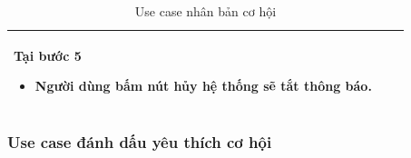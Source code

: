 \documentclass[12pt,a4paper]{article}
\begin{document}
\begin{table}[H]
\begin{tabular}{|p{3.5cm}|p{11.5cm}|c|}
            Tại bước 5\newline
            \vspace{-.8cm}\begin{itemize}
                              \item Người dùng bấm nút hủy hệ thống sẽ tắt thông báo.
            \end{itemize} \\
            \hline
        \end{tabular}
        \caption{Use case nhân bản cơ hội }

    \end{table}


    \subsubsection*{Use case đánh dấu yêu thích cơ hội}
\end{document}
